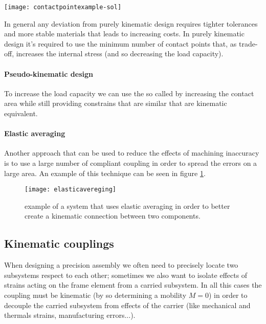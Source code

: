 	\begin{SCfigure}[2][bht]
		\centering
		\texttt{[image: contactpointexample-sol]}
		\caption{practical solution of the kinematic design of a rotary shaft drawn in figure \ref{fig:ps:contactpointexample}.}
		\label{fig:ps:contactsolution}
	\end{SCfigure}
	
	In general any deviation from purely kinematic design requires tighter tolerances and more stable materials that leads to increasing costs. In purely kinematic design it's required to use the minimum number of contact points that, as trade-off, increases the internal stress (and so decreasing the load capacity).
	
	\paragraph{Pseudo-kinematic design} To increase the load capacity we can use the so called  by increasing the contact area while still providing constrains that are similar that are kinematic equivalent.
	
	\paragraph{Elastic averaging} Another approach that can be used to reduce the effects of machining inaccuracy is to use a large number of compliant coupling in order to spread the errors on a large area.	An example of this technique can be seen in figure \ref{fig:ps:elasticaveraging}.
	
	\begin{figure}[bht]
		\centering
		\texttt{[image: elasticavereging]}
		\caption{example of a system that uses elastic averaging in order to better create a kinematic connection between two components.}
		\label{fig:ps:elasticaveraging}
	\end{figure}
	
	\subsection{Kinematic couplings}
		When designing a precision assembly we often need to precisely locate two subsystems respect to each other; sometimes we also want to isolate effects of strains acting on the frame element from a carried subsystem. In all this cases the coupling must be kinematic (by so determining a mobility $M=0$) in order to decouple the carried subsystem from effects of the carrier (like mechanical and thermals strains, manufacturing errors...).
		
